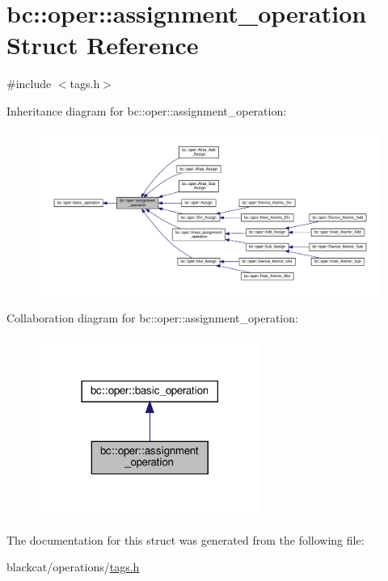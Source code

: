 \hypertarget{structbc_1_1oper_1_1assignment__operation}{}\section{bc\+:\+:oper\+:\+:assignment\+\_\+operation Struct Reference}
\label{structbc_1_1oper_1_1assignment__operation}


{\ttfamily \#include $<$tags.\+h$>$}



Inheritance diagram for bc\+:\+:oper\+:\+:assignment\+\_\+operation\+:\nopagebreak
\begin{figure}[H]
\begin{center}
\leavevmode
\includegraphics[width=350pt]{structbc_1_1oper_1_1assignment__operation__inherit__graph}
\end{center}
\end{figure}


Collaboration diagram for bc\+:\+:oper\+:\+:assignment\+\_\+operation\+:\nopagebreak
\begin{figure}[H]
\begin{center}
\leavevmode
\includegraphics[width=206pt]{structbc_1_1oper_1_1assignment__operation__coll__graph}
\end{center}
\end{figure}


The documentation for this struct was generated from the following file\+:\begin{DoxyCompactItemize}
\item 
blackcat/operations/\hyperlink{tags_8h}{tags.\+h}\end{DoxyCompactItemize}
